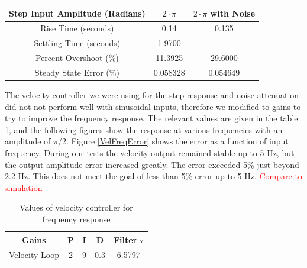 \documentclass{article}
\newcommand{\xxx}[1]{\textcolor{red}{#1}}
\theoremstyle{plain}
\theoremstyle{definition}
\theoremstyle{remark}
\begin{document}
\begin{table}
\begin{center}
    \begin{tabular}{|c|c|c|}
        \hline
        Step Input Amplitude (Radians) & $2 \cdot \pi$ & $2 \cdot \pi$ with Noise \\ \hline
        Rise Time (seconds)            & 0.14          & 0.135                    \\ 
        Settling Time (seconds)        & 1.9700        &  -                    \\ 
        Percent Overshoot (\%)         & 11.3925       & 29.6000                  \\ 
        Steady State Error (\%)        & 0.058328      & 0.054649                 \\
        \hline
    \end{tabular}
\end{center}
\end{table}

The velocity controller we were using for the step response and noise attenuation did not not perform well with sinusoidal inputs, therefore we modified to gains to try to improve the frequency response. The relevant values are given in the table \ref{VelFreqGains}, and the following figures show the response at various frequencies with an amplitude of $\pi$/2. Figure \ref{VelFreqError} shows the error as a function of input frequency. During our tests the velocity output remained stable up to 5 Hz, but the output amplitude error increased greatly. The error exceeded 5\% just beyond 2.2 Hz. This does not meet the goal of less than 5\% error up to 5 Hz.
\xxx{Compare to simulation}

\begin{table}[htb]
\begin{center}
    \begin{tabular}{|c|c|c|c|c|}
        \hline
        Gains & P   & I & D     & Filter $\tau$   \\ \hline
        Velocity Loop       & 2   & 9    & 0.3   & 6.5797  \\ 
       \hline
    \end{tabular}
\end{center}
\caption{Values of velocity controller for frequency response}
\label{VelFreqGains}
\end{table}
\end{document}
